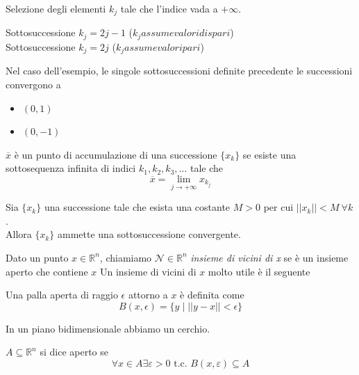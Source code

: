 \begin{defn}[Sottosuccessione]
 Selezione degli elementi $k_j$ tale che l'indice vada a $+\infty$.
\end{defn}
\begin{example}
Sottosuccessione $k_j = 2j-1$ ($k_j assume valori dispari$)\\
Sottosuccessione  $k_j = 2j$  ($k_j assume valori pari$)
\end{example}
Nel caso dell'esempio, le singole sottosuccessioni definite precedente
le successioni convergono a
\begin{itemize}
 \item $(0,1)$
 \item $(0,-1)$
\end{itemize}
\begin{defn}
$\overline{x}$ è un punto di accumulazione di una successione
 $\{x_k\}$  se esiste una sottosequenza infinita di indici $k_1,k_2,
k_3, \ldots$ tale che
$$\overline{x} =   \lim_{j \to +\infty}x_{k_{j}}$$

\end{defn}

\begin{theo}
 Sia $\{x_k\}$ una successione tale che  esista una costante $M>0$ 
per cui $||x_k|| < M ~ \forall k$.\\
Allora $\{x_k\}$ ammette una sottosuccessione convergente.
\end{theo}

\begin{defn}
 Dato un punto $x \in \mathbb{R}^{n}$, chiamiamo
$\mathcal{N} \in \mathbb{R}^{n}$  \emph{insieme di vicini di x} se
è un insieme aperto che contiene $x$
Un insieme di vicini di $x$ molto utile è il seguente
\end{defn}

\begin{defn}
Una palla aperta di raggio $\epsilon$ attorno a $x$ \`e
definita come
$$ B(x,\epsilon) = \{ y \; | \; ||y-x|| < \epsilon \}$$
\end{defn}
In un piano bidimensionale abbiamo un cerchio.


\begin{defn}
 $A \subseteq \mathbb{R}^{n}$ si dice aperto se
$$\forall x \in A \exists \varepsilon > 0 
   \text { t.c. }
 B(x, \varepsilon) \subseteq A
$$
\end{defn}

